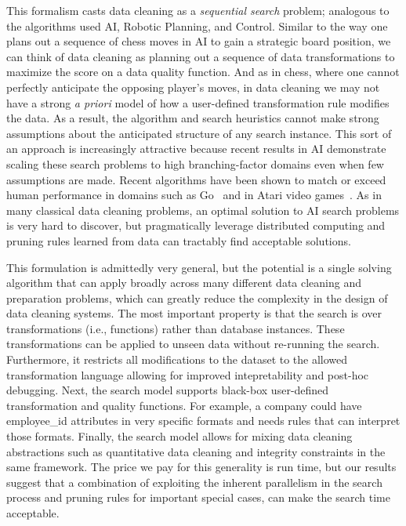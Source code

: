 This formalism casts data cleaning as a \emph{sequential search} problem; analogous to the algorithms used AI, Robotic Planning, and Control.
Similar to the way one plans out a sequence of chess moves in AI to gain a strategic board position, we can think of data cleaning as planning out a sequence of data transformations to maximize the score on a data quality function.
And as in chess, where one cannot perfectly anticipate the opposing player's moves, in data cleaning we may not have a strong \emph{a priori} model of how a user-defined transformation rule modifies the data.
As a result, the algorithm and search heuristics cannot make strong assumptions about the anticipated structure of any search instance.
This sort of an approach is increasingly attractive because recent results in AI demonstrate scaling these search problems to  high branching-factor domains even when few assumptions are made.
Recent algorithms have been shown to match or exceed human performance in domains such as Go~\cite{silver2016mastering} and in Atari video games~\cite{mnih2015human}.
As in many classical data cleaning problems, an optimal solution to AI search problems is very hard to discover, but pragmatically leverage distributed computing and pruning rules learned from data can tractably find acceptable solutions.

This formulation is admittedly very general, but the potential is a single solving algorithm that can apply broadly across many different data cleaning and preparation problems, which can greatly reduce the complexity in the design of data cleaning systems.
The most important property is that the search is over transformations (i.e., functions) rather than database instances.
These transformations can be applied to unseen data without re-running the search. 
Furthermore, it restricts all modifications to the dataset to the allowed transformation language allowing for improved intepretability and post-hoc debugging.
Next, the search model supports black-box user-defined transformation and quality functions. 
For example, a company could have \textsf{employee\_id} attributes in very specific formats and needs rules that can interpret those formats.
Finally, the search model allows for mixing data cleaning abstractions such as quantitative data cleaning and integrity constraints in the same framework.
The price we pay for this generality is run time, but our results suggest that a combination of exploiting the inherent parallelism in the search process and pruning rules for important special cases, can make the search time acceptable.

